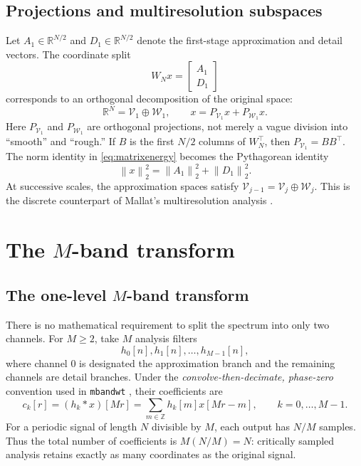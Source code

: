 \documentclass{article}
\theoremstyle{definition}
\theoremstyle{remark}
\newcommand{\R}{\mathbb R}
\newcommand{\Z}{\mathbb Z}
\newcommand{\V}{\mathcal V}
\newcommand{\W}{\mathcal W}
\newcommand{\norm}[1]{\left\lVert#1\right\rVert}
\begin{document}
\subsection{Projections and multiresolution subspaces}
Let $A_1\in\R^{N/2}$ and $D_1\in\R^{N/2}$ denote the first-stage approximation and detail vectors. The coordinate split
\begin{equation}
W_Nx=\begin{bmatrix}A_1\\D_1\end{bmatrix}
\end{equation}
corresponds to an orthogonal decomposition of the original space:
\begin{equation}
\R^N=\V_1\oplus\W_1,
\qquad x=P_{\V_1}x+P_{\W_1}x.
\end{equation}
Here $P_{\V_1}$ and $P_{\W_1}$ are orthogonal projections, not merely a vague division into ``smooth'' and ``rough.'' If $B$ is the first $N/2$ columns of $W_N^\top$, then $P_{\V_1}=BB^\top$. The norm identity in \eqref{eq:matrixenergy} becomes the Pythagorean identity
\begin{equation}
\norm{x}_2^2=\norm{A_1}_2^2+\norm{D_1}_2^2.
\end{equation}
At successive scales, the approximation spaces satisfy $\V_{j-1}=\V_j\oplus\W_j$. This is the discrete counterpart of Mallat's multiresolution analysis \cite{mallat1989}.

\section{The \texorpdfstring{$M$}{M}-band transform}
\subsection{The one-level \texorpdfstring{$M$}{M}-band transform}
There is no mathematical requirement to split the spectrum into only two channels. For $M\ge2$, take $M$ analysis filters
\begin{equation}
h_0[n],h_1[n],\ldots,h_{M-1}[n],
\end{equation}
where channel $0$ is designated the approximation branch and the remaining channels are detail branches. Under the \emph{convolve-then-decimate, phase-zero} convention used in \texttt{mbandwt} \cite{su2026}, their coefficients are
\begin{equation}
 c_k[r]=(h_k*x)[Mr]=\sum_{m\in\Z}h_k[m]x[Mr-m],
 \qquad k=0,\ldots,M-1.
 \label{eq:analysis}
\end{equation}
For a periodic signal of length $N$ divisible by $M$, each output has $N/M$ samples. Thus the total number of coefficients is $M(N/M)=N$: critically sampled analysis retains exactly as many coordinates as the original signal.
\end{document}
